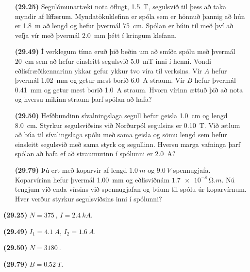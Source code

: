 \begin{enumerate}[label = \textbf{(\alph*)}]

\item[\textbf{(29.25)}] Segulómunartæki nota öflugt, \SI{1.5}{T}, segulsvið til þess að taka myndir af líffærum. Myndatökuklefinn er spóla sem er hönnuð þannig að hún er \SI{1.8}{m} að lengd og hefur þvermál \SI{75}{cm}. Spólan er búin til með því að vefja vír með þvermál \SI{2.0}{mm} þétt í kringum klefann. 

\item[\textbf{(29.49)}] Í verklegum tíma eruð þið beðin um að smíða spólu með þvermál \SI{20}{cm} sem að hefur einsleitt segulsvið \SI{5.0}{mT} inni í henni. Vondi eðlisfræðikennarinn ykkar gefur ykkur tvo víra til verksins. Vír $A$ hefur þvermál \SI{1.02}{mm} og getur mest borið \SI{6.0}{A} straum. Vír $B$ hefur þvermál \SI{0.41}{mm} og getur mest borið \SI{1.0}{A} straum. Hvorn vírinn ættuð þið að nota og hversu mikinn straum þarf spólan að hafa?

\item[\textbf{(29.50)}] Hefðbundinn sívalningslaga segull hefur geisla \SI{1.0}{cm} og lengd \SI{8.0}{cm}. Styrkur segulsviðsins við Norðurpól segulsins er \SI{0.10}{T}. Við ætlum að búa til sívalingslaga spólu með sama geisla og sömu lengd sem hefur einsleitt segulsvið með sama styrk og segullinn. Hversu marga vafninga þarf spólan að hafa ef að straumurinn í spólunni er \SI{2.0}{A}?

\item[\textbf{(29.79)}] Þú ert með koparvír af lengd $\SI{1.0}{m}$ og $\SI{9.0}{V}$ spennugjafa. Koparvírinn hefur þvermál \SI{1.00}{mm} og eðlisviðnám $\SI{1.7e-8}{\ohm.m}$. Nú tengjum við enda vírsins við spennugjafan og búum til spólu úr koparvírnum. Hver verður styrkur segulsviðsins inni í spólunni?


\end{enumerate}


\begin{tcolorbox}
\begin{enumerate*}[label = ]
  \item \textbf{(29.25)} $N = \SI{375}{}$, $I = \SI{2.4}{kA}$.
  \item \textbf{(29.49)} $I_1 = \SI{4.1}{A}$, $I_2 = \SI{1.6}{A}$.
  \item \textbf{(29.50)} $N = \SI{3180}{}$. \\
  \item \textbf{(29.79)} $B = \SI{0.52}{T}$.
\end{enumerate*}
\end{tcolorbox}

\newpage